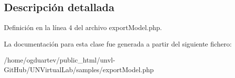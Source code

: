 \subsection{Descripción detallada}


Definición en la línea 4 del archivo export\+Model.\+php.



La documentación para esta clase fue generada a partir del siguiente fichero\+:\begin{DoxyCompactItemize}
\item 
/home/ogduartev/public\+\_\+html/unvl-\/\+Git\+Hub/\+U\+N\+Virtual\+Lab/samples/export\+Model.\+php\end{DoxyCompactItemize}
